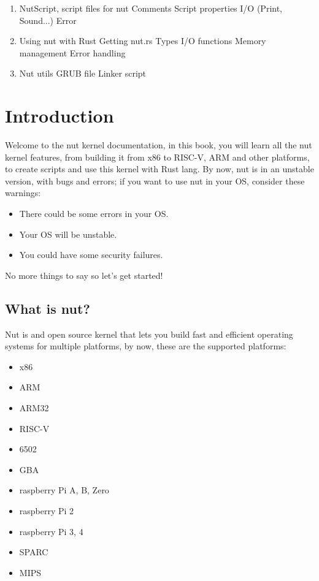 \documentclass{article}
\begin{document}
\begin{enumerate}
    \\
  	\Large \item NutScript, script files for nut
  	\large \subitem Comments
    \large \subitem Script properties
    \large \subitem I/O (Print, Sound...)
    \large \subitem Error
    \\
    \Large \item Using nut with Rust
    \large \subitem Getting nut.rs
    \large \subitem Types
    \large \subitem I/O functions
    \large \subitem Memory management
    \large \subitem Error handling
    \\
    \Large \item Nut utils
    \large \subitem GRUB file
    \large \subitem Linker script
  \end{enumerate}
  \newpage

  \section{Introduction}
  Welcome to the nut kernel documentation, in this book, you will learn all the nut kernel features, from building it from x86 to RISC-V, ARM and other platforms, to create scripts and use this kernel with Rust lang. By now, nut is in an unstable version, with bugs and errors; if you want to use nut in your OS, consider these warnings:
  \begin{itemize}
    \item There could be some errors in your OS.
    \item Your OS will be unstable.
    \item You could have some security failures.
  \end{itemize}
  No more things to say so let's get started!
  \\
  \subsection{What is nut?}
  Nut is and open source kernel that lets you build fast and efficient operating systems for multiple platforms, by now, these are the supported platforms:
  \begin{itemize}
    \item x86
    \item ARM
    \item ARM32
    \item RISC-V
    \item 6502
    \item GBA
    \item raspberry Pi A, B, Zero
    \item raspberry Pi 2
    \item raspberry Pi 3, 4
    \item SPARC
    \item MIPS
  \end{itemize}
\end{document}

